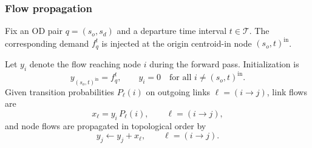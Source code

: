 \subsubsection{Flow propagation}

Fix an OD pair $q=(s_o,s_d)$ and a departure time interval $t\in\mathcal{T}$.
The corresponding demand $f_q^t$ is injected at the origin centroid-in node $(s_o,t)^{\mathrm{in}}$.

Let $y_i$ denote the flow reaching node $i$ during the forward pass. Initialization is
\[
y_{(s_o,t)^{\mathrm{in}}}=f_q^t,
\qquad
y_i=0 \quad \text{for all } i \neq (s_o,t)^{\mathrm{in}}.
\]
Given transition probabilities $P_\ell(i)$ on outgoing links $\ell=(i\to j)$, link flows are
\[
x_\ell = y_i\, P_\ell(i),
\qquad \ell=(i\to j),
\]
and node flows are propagated in topological order by
\[
y_j \leftarrow y_j + x_\ell,
\qquad \ell=(i\to j).
\]


